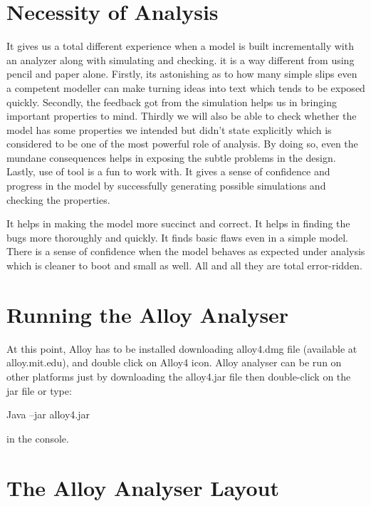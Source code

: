 \documentclass[a4paper,12pt]{report}
\begin{document}
\section{Necessity of Analysis}
\label{Necessity of analysis}

It gives us a total different experience when a model is built incrementally with an analyzer along with simulating and checking. it is a way different from using pencil and paper alone. Firstly, its astonishing as to how many simple slips even a competent modeller can make turning ideas into text which tends to be exposed quickly. Secondly, the feedback got from the simulation helps us in bringing important properties to mind. Thirdly we will also be able to check whether the model has some properties we intended but didn't state explicitly which is considered to be one of the most powerful role of analysis. By doing so, even the mundane consequences helps in exposing the subtle problems in the design. Lastly, use of tool is a fun to work with. It gives a sense of confidence and progress in the model by successfully generating possible simulations and checking the properties. 

It helps in making the model more succinct and correct. It helps in finding the bugs more thoroughly and quickly. It finds basic flaws even in a simple model. There is a sense of confidence when the model behaves as expected under analysis which is cleaner to boot and small as well. All and all they are total error-ridden.
   
\section{Running the Alloy Analyser}
\label{Run Alloy Analyzer}

At this point, Alloy has to be installed downloading alloy4.dmg file (available at alloy.mit.edu), and double click on Alloy4 icon. Alloy analyser can be run on other platforms just by downloading the alloy4.jar file then double-click on the jar file or type:

\begin{center}
Java –jar alloy4.jar
\end{center}

in the console.

\section{The Alloy Analyser Layout}
\label{Alloy Analyser layout}
\end{document}
